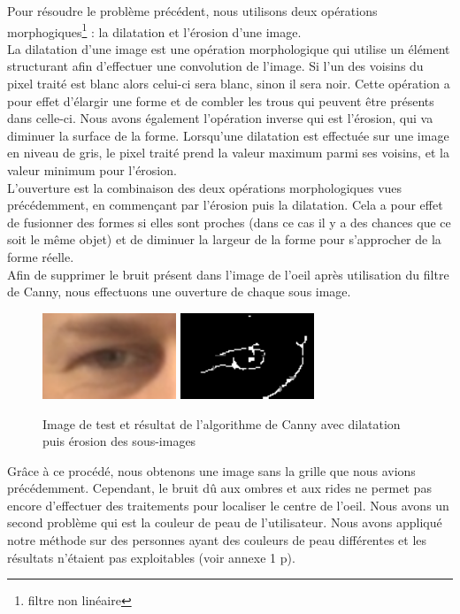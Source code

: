 Pour résoudre le problème précédent, nous utilisons deux opérations morphogiques\footnote{filtre non linéaire} :
la dilatation et l'érosion d'une image.\\

La dilatation d'une image est une opération morphologique qui utilise 
un élément structurant afin d'effectuer une convolution de l'image. Si l'un des voisins du pixel traité
est blanc alors celui-ci sera blanc, sinon il sera noir.
Cette opération a pour effet d'élargir une forme et de combler les trous qui peuvent être présents
dans celle-ci. Nous avons également l'opération inverse qui est l'érosion, qui va diminuer la surface de la forme.
Lorsqu'une dilatation est effectuée sur une image en niveau de gris, le pixel traité prend la valeur maximum parmi
ses voisins, et la valeur minimum pour l'érosion.\\

L'ouverture est la combinaison des deux opérations morphologiques vues précédemment, en commençant par 
l'érosion puis la dilatation. Cela a pour effet de fusionner des formes si elles sont proches (dans ce
cas il y a des chances que ce soit le même objet) et de diminuer la largeur de la forme pour 
s'approcher de la forme réelle.\\ 

Afin de supprimer le bruit présent dans l'image de l'oeil après utilisation du filtre de Canny, nous effectuons une ouverture
de chaque sous image.

\begin{figure}[H]
 \center
 \includegraphics[width=4cm]{image/original.png}
 \includegraphics[width=4cm]{image/canny_final.png}
 \caption{Image de test et résultat de l'algorithme de Canny avec dilatation puis érosion des sous-images}
\end{figure}

Grâce à ce procédé, nous obtenons une image sans la grille que nous avions précédemment. Cependant,
le bruit dû aux ombres et aux rides ne permet pas encore d'effectuer des traitements pour localiser le centre de l'oeil.
Nous avons un second problème qui est la couleur de peau de l'utilisateur. Nous avons appliqué notre méthode 
sur des personnes ayant des couleurs de peau différentes et les résultats n'étaient pas exploitables (voir annexe 1 p\pageref{resultCanny}).\\ 

